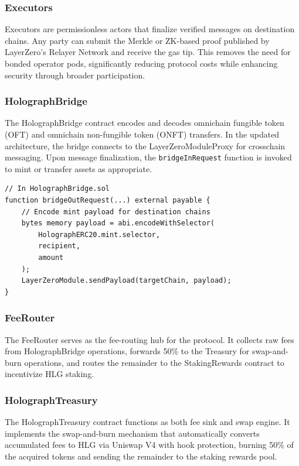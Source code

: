 \documentclass[10pt,a4paper,twocolumn]{article}
\begin{document}
\subsubsection{Executors}
Executors are permissionless actors that finalize verified messages on destination chains. Any party can submit the Merkle or ZK-based proof published by LayerZero's Relayer Network and receive the gas tip. This removes the need for bonded operator pods, significantly reducing protocol costs while enhancing security through broader participation.

\subsubsection{HolographBridge}
The HolographBridge contract encodes and decodes omnichain fungible token (OFT) and omnichain non-fungible token (ONFT) transfers. In the updated architecture, the bridge connects to the LayerZeroModuleProxy for crosschain messaging. Upon message finalization, the \texttt{bridgeInRequest} function is invoked to mint or transfer assets as appropriate.

\begin{lstlisting}[language=Solidity, caption=HolographBridge.sol code snippet]
// In HolographBridge.sol
function bridgeOutRequest(...) external payable {
    // Encode mint payload for destination chains
    bytes memory payload = abi.encodeWithSelector(
        HolographERC20.mint.selector,
        recipient,
        amount
    );
    LayerZeroModule.sendPayload(targetChain, payload);
}
\end{lstlisting}

\subsubsection{FeeRouter}
The FeeRouter serves as the fee-routing hub for the protocol. It collects raw fees from HolographBridge operations, forwards 50\% to the Treasury for swap-and-burn operations, and routes the remainder to the StakingRewards contract to incentivize HLG staking.

\subsubsection{HolographTreasury}
The HolographTreasury contract functions as both fee sink and swap engine. It implements the swap-and-burn mechanism that automatically converts accumulated fees to HLG via Uniswap V4 with hook protection, burning 50\% of the acquired tokens and sending the remainder to the staking rewards pool.
\end{document}
